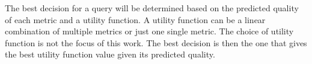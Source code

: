  The best decision for a query will be determined based on the predicted quality of each metric and a utility function. A utility function can be a linear combination of multiple metrics or just one single metric. The choice of utility function is not the focus of this work. The best decision is then the one that gives the best utility function value given its predicted quality.



